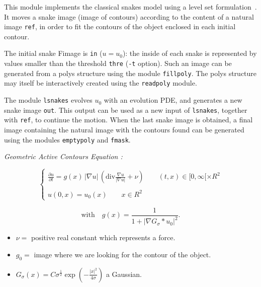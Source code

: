 This module implements the classical snakes model using a
level set formulation~\cite{caselles.catte.ea:geometric}. 
It moves a snake image (image of contours) according to the content of a natural image \verb+ref+, in
order to fit the contours of the object enclosed in each initial contour.

The initial snake Fimage is \verb+in+ ($ u = u_0 $): the inside of each
snake is represented by values smaller than the threshold \verb+thre+ 
(\verb+-t+ option).
Such an image can be generated from a polys structure using the module 
\verb+fillpoly+.%
The polys structure may itself be interactively created using the \verb+readpoly+ module. %

The module \verb+lsnakes+ evolves $ u_0 $ with an evolution PDE,
and generates a new snake image \verb+out+.
This output can be used as a new input of \verb+lsnakes+, together with
\verb+ref+, to continue the motion.
When the last snake image is obtained, a final image containing the natural
image with the contours found can be generated using the modules
\verb+emptypoly+ and \verb+fmask+.

\vspace{1cm}

{\em Geometric Active Contours Equation :} 
  
  $$
    \left\{
    \begin{array}{ll}
\displaystyle
    \frac {\partial u}{\partial t} = g(x) \, |\nabla u|\,
\left(\mathrm{div}\frac{\nabla u}{|\nabla u|} + \nu\right) \qquad  
    (t,x) \in {[0,\infty[ \times R^2} \\
\\
    u(0,x) = u_0(x) \qquad 
    x\in{R^2}
    \end{array}     
    \right.
  $$

$$ \mathrm{with}\quad
g(x) = \frac{1}{1+|\nabla G_\sigma \ast u_0|^2}.$$
     
\begin{itemize}
\item $ \nu = $ positive real constant which represents a force.
\item $ g_0 = $ image where we are looking for the contour of the object. 
\item $ G_\sigma(x) = C\sigma^\frac{1}{2}\exp(-\frac{|x|^2}{4\sigma}) $ a Gaussian. 
\end{itemize}
   

%

